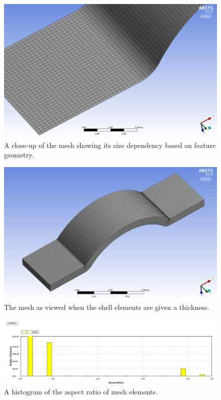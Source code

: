 \begin{figure}[htp]
\centering
\includegraphics[width=1\textwidth]{./figures/fea/fea-mechanical-mesh-closeup}
\caption{A close-up of the mesh showing its size dependency based on feature geometry.}
\label{fig:fea-mechanical-mesh-closeup}
\end{figure}

\begin{figure}[htp]
\centering
\includegraphics[width=1\textwidth]{./figures/fea/fea-mechanical-mesh-thick-shell}
\caption{The mesh as viewed when the shell elements are given a thickness.}
\label{fig:fea-mechanical-mesh-thick-shell}
\end{figure}

\begin{figure}[htp]
\centering
\includegraphics[width=1\textwidth]{./figures/fea/fea-mechanical-mesh-metrics-histogram}
\caption{A histogram of the aspect ratio of mesh elements.}
\label{fig:fea-mechanical-mesh-metrics-histogram}
\end{figure}

